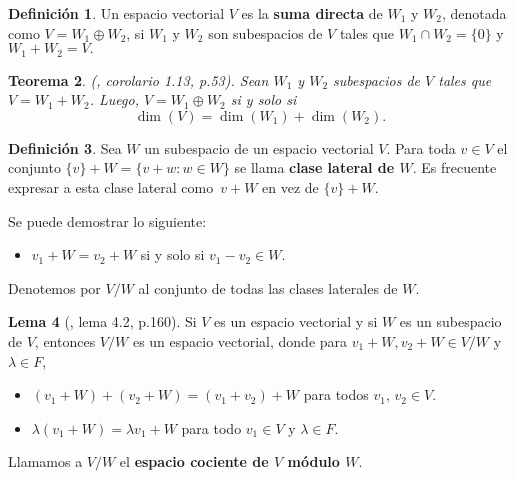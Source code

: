 \documentclass[12pt]{book}
\newtheorem{theorem}{Teorema}[section]
\theoremstyle{definition}
\newtheorem{definition}[theorem]{Definición}
\newtheorem{lemma}[theorem]{Lema}
\newcounter{in}
\newcounter{ini}
\begin{document}
\begin{definition}
  \label{suma-directa}
  Un espacio vectorial $V$ es la \textbf{suma directa} de $W_{1}$ y
  $W_{2}$, denotada como $V=W_{1}\oplus W_{2}$, si $W_{1}$ y $W_{2}$
  son subespacios de $V$ tales que $W_{1}\cap W_{2}=\{0\}$ y
  $W_{1}+W_{2}=V.$ 
\end{definition}


\begin{theorem}{\normalfont (\cite{friedberg1982algebra}, corolario 1.13, p.53)}. 
  Sean $W_{1}$ y $W_{2}$ subespacios de $V$ tales que
  $V=W_{1}+W_{2}$. Luego, $V=W_{1}\oplus W_{2}$ si y solo si 
  $$\dim(V)=\dim(W_{1})+\dim(W_{2}).$$
\end{theorem}

\begin{definition}
  Sea $W$ un subespacio de un espacio vectorial $V$. Para toda $v\in V$ el conjunto $\{v\}+W=\{v+w:w\in W\}$ se
  llama \textbf{clase lateral de $W$}. Es frecuente
  expresar a esta clase lateral como~$v+W$ en vez de $\{v\}+W$. 
\end{definition}

Se puede demostrar lo siguiente:
\begin{itemize}
\item $v_{1}+W=v_{2}+W$ si y solo si $v_{1}-v_{2}\in W.$
\end{itemize}
Denotemos por $V/W$ al conjunto de todas las clases laterales de $W$.
\begin{lemma}[\cite{herstein1990algebra}, lema 4.2, p.160]
  \label{esp-coc}
  Si $V$ es un espacio vectorial y si $W$ es un subespacio de $V$,
  entonces $V/W$ es un espacio vectorial, donde para $v_{1}+W,v_{2}+W\in V/W$ y
  $\lambda\in F$,
  \begin{itemize}
  \item $(v_{1}+W)+(v_{2}+W)=(v_{1}+v_{2})+W$ para todos $v_{1}$, $v_{2}\in V$.
  \item $\lambda(v_{1}+W)=\lambda v_{1}+W$ para todo $v_{1}\in V$ y $\lambda\in F$.
  \end{itemize}
  Llamamos a $V/W$ el \textbf{espacio cociente de $V$ módulo $W$}.
\end{lemma}
\end{document}
